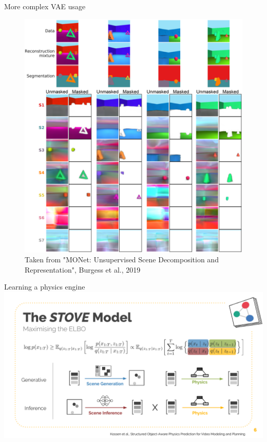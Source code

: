 \documentclass[10pt,aspectratio=169,handout]{beamer}
\begin{document}
\begin{frame}{More complex VAE usage}
    \begin{figure}
        \includegraphics[height=0.7\textheight]{figs/monet_oir_decomposition_masked.png}
        \caption{Taken from "MONet: Unsupervised Scene Decomposition and Representation", Burgess et al., 2019}
    \end{figure}
\end{frame}

\begin{frame}{Learning a physics engine}
    \includegraphics[width=\textwidth]{figs/stove-6.pdf}

\end{frame}
\end{document}

